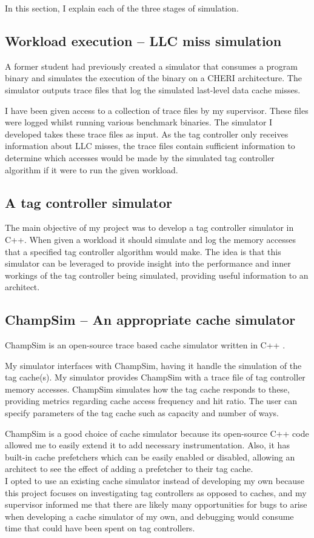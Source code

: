 In this section, I explain each of the three stages of simulation.

\subsection{Workload execution -- LLC miss simulation}
A former student had previously created a simulator that consumes a program binary and simulates the execution of the binary on a CHERI architecture. The simulator outputs trace files that log the simulated last-level data cache misses.

I have been given access to a collection of trace files by my supervisor. These files were logged whilst running various benchmark binaries. The simulator I developed takes these trace files as input. As the tag controller only receives information about LLC misses, the trace files contain sufficient information to determine which accesses would be made by the simulated tag controller algorithm if it were to run the given workload.

\subsection{A tag controller simulator}
The main objective of my project was to develop a tag controller simulator in C++. When given a workload it should simulate and log the memory accesses that a specified tag controller algorithm would make. The idea is that this simulator can be leveraged to provide insight into the performance and inner workings of the tag controller being simulated, providing useful information to an architect.

\subsection{ChampSim -- An appropriate cache simulator}
ChampSim is an open-source trace based cache simulator written in C++ \cite{champsim}.

My simulator interfaces with ChampSim, having it handle the simulation of the tag cache(s). My simulator provides ChampSim with a trace file of tag controller memory accesses. ChampSim simulates how the tag cache responds to these, providing metrics regarding cache access frequency and hit ratio. The user can specify parameters of the tag cache such as capacity and number of ways.

ChampSim is a good choice of cache simulator because its open-source C++ code allowed me to easily extend it to add necessary instrumentation. Also, it has built-in cache prefetchers which can be easily enabled or disabled, allowing an architect to see the effect of adding a prefetcher to their tag cache.\\
I opted to use an existing cache simulator instead of developing my own because this project focuses on investigating tag controllers as opposed to caches, and my supervisor informed me that there are likely many opportunities for bugs to arise when developing a cache simulator of my own, and debugging would consume time that could have been spent on tag controllers.

